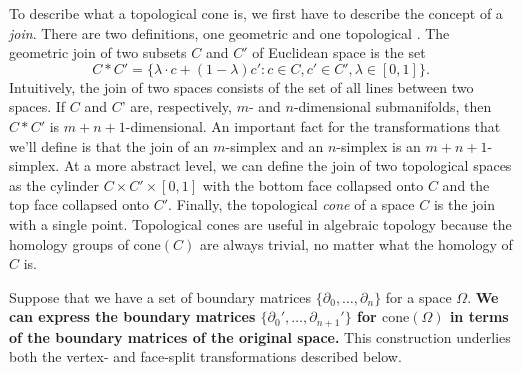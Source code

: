 \documentclass[twocolumn]{article}
\begin{document}
To describe what a topological cone is, we first have to describe the concept of a \emph{join}.
There are two definitions, one geometric and one topological \cite{hatcher2002algebraic}.
The geometric join of two subsets $C$ and $C'$ of Euclidean space is the set
\begin{equation}
    C * C' = \{\lambda\cdot c + (1 - \lambda)c' : c \in C, c' \in C', \lambda \in [0, 1]\}.
\end{equation}
Intuitively, the join of two spaces consists of the set of all lines between two spaces.
If $C$ and $C$' are, respectively, $m$- and $n$-dimensional submanifolds, then $C * C'$ is $m + n + 1$-dimensional.
An important fact for the transformations that we'll define is that the join of an $m$-simplex and an $n$-simplex is an $m + n + 1$-simplex.
At a more abstract level, we can define the join of two topological spaces as the cylinder $C \times C' \times [0, 1]$ with the bottom face collapsed onto $C$ and the top face collapsed onto $C'$.
Finally, the topological \emph{cone} of a space $C$ is the join with a single point.
Topological cones are useful in algebraic topology because the homology groups of $\text{cone}(C)$ are always trivial, no matter what the homology of $C$ is.

Suppose that we have a set of boundary matrices $\{\partial_0, \ldots, \partial_n\}$ for a space $\Omega$.
\textbf{We can express the boundary matrices $\{\partial_0', \ldots, \partial_{n + 1}'\}$ for $\text{cone}(\Omega)$ in terms of the boundary matrices of the original space.}
This construction underlies both the vertex- and face-split transformations described below.
\end{document}
